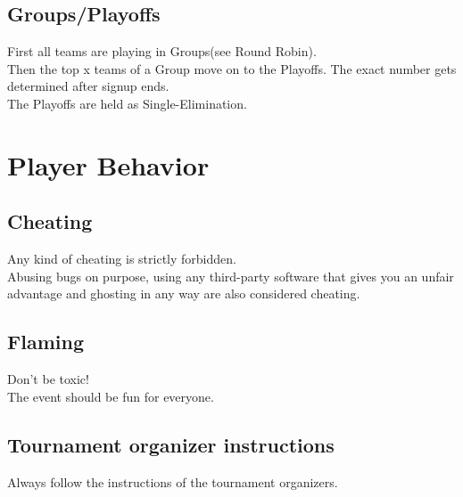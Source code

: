 \documentclass{article}
\begin{document}
\subsection{Groups/Playoffs}
First all teams are playing in Groups(see %
Round Robin).\\
Then the top x teams of a Group move on to the Playoffs. The exact number gets determined after signup ends.\\
The Playoffs are held as Single-Elimination.


\section{Player Behavior}
\subsection{Cheating}
Any kind of cheating is strictly forbidden.\\
Abusing bugs on purpose, using any third-party software that gives you an unfair advantage and ghosting in any way are also considered cheating.

\subsection{Flaming}
Don't be toxic!\\
The event should be fun for everyone.


\subsection{Tournament organizer instructions}
Always follow the instructions of the tournament organizers.
\end{document}

